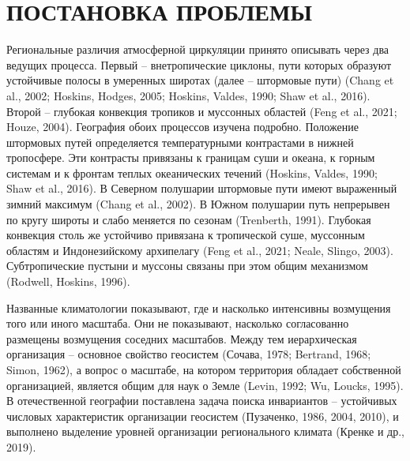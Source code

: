 \documentclass[12pt,a4paper]{article}
\begin{document}
\section{ПОСТАНОВКА ПРОБЛЕМЫ}

Региональные различия атмосферной циркуляции принято описывать через два ведущих процесса. Первый -- внетропические циклоны, пути которых образуют устойчивые полосы в умеренных широтах (далее -- штормовые пути) (Chang et al., 2002; Hoskins, Hodges, 2005; Hoskins, Valdes, 1990; Shaw et al., 2016). Второй -- глубокая конвекция тропиков и муссонных областей (Feng et al., 2021; Houze, 2004). География обоих процессов изучена подробно. Положение штормовых путей определяется температурными контрастами в нижней тропосфере. Эти контрасты привязаны к границам суши и океана, к горным системам и к фронтам теплых океанических течений (Hoskins, Valdes, 1990; Shaw et al., 2016). В Северном полушарии штормовые пути имеют выраженный зимний максимум (Chang et al., 2002). В Южном полушарии путь непрерывен по кругу широты и слабо меняется по сезонам (Trenberth, 1991). Глубокая конвекция столь же устойчиво привязана к тропической суше, муссонным областям и Индонезийскому архипелагу (Feng et al., 2021; Neale, Slingo, 2003). Субтропические пустыни и муссоны связаны при этом общим механизмом (Rodwell, Hoskins, 1996).

Названные климатологии показывают, где и насколько интенсивны возмущения того или иного масштаба. Они не показывают, насколько согласованно размещены возмущения соседних масштабов. Между тем иерархическая организация -- основное свойство геосистем (Сочава, 1978; Bertrand, 1968; Simon, 1962), а вопрос о масштабе, на котором территория обладает собственной организацией, является общим для наук о Земле (Levin, 1992; Wu, Loucks, 1995). В отечественной географии поставлена задача поиска инвариантов -- устойчивых числовых характеристик организации геосистем (Пузаченко, 1986, 2004, 2010), и выполнено выделение уровней организации регионального климата (Кренке и др., 2019).
\end{document}
